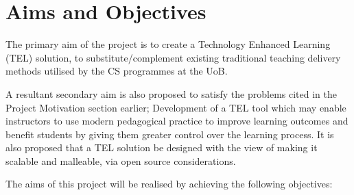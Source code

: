 \section{Aims and Objectives}
\label{sec:sec01}

The primary aim of the project is to create a Technology Enhanced Learning (TEL) solution, to substitute/complement existing traditional teaching delivery methods utilised by the CS programmes at the UoB.

A resultant secondary aim is also proposed to satisfy the problems cited in the Project Motivation section earlier; Development of a TEL tool which may enable instructors to use modern pedagogical practice to improve learning outcomes and benefit students by giving them greater control over the learning process. It is also proposed that a TEL solution be designed with the view of making it scalable and malleable, via open source considerations.

\newpage
The aims of this project will be realised by achieving the following objectives:

